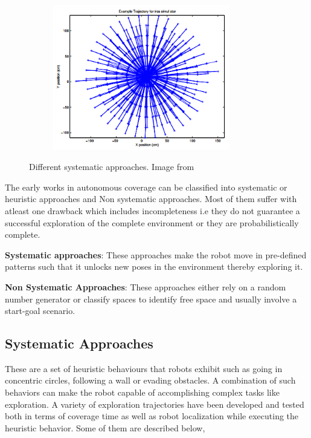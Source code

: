 \begin{figure}
\begin{subfigure}[b]{0.498\textwidth}
		\label{subfig:d}
		\caption{}
	\end{subfigure}
	\begin{subfigure}[b]{0.498\textwidth}
	    \centering
		\includegraphics[width=0.85\textwidth, height=0.85\textwidth]{images/star.png}
		\label{subfig:e}
		\caption{}
	\end{subfigure}
    \caption{Different systematic approaches. Image from \cite{13}}
\end{figure}

The early works in autonomous coverage can be classified into systematic or heuristic approaches and Non systematic approaches. Most of them suffer with atleast one drawback which includes incompleteness i.e they do not guarantee a successful exploration of the complete environment or they are probabilistically complete.

\textbf{Systematic approaches}: These approaches make the robot move in pre-defined patterns such that it unlocks new poses in the environment thereby exploring it.

\textbf{Non Systematic Approaches}: These approaches either rely on a random number generator or classify spaces to identify free space and usually involve a start-goal scenario.

\subsection{Systematic Approaches}
These are a set of heuristic behaviours that robots exhibit such as going in concentric circles, following a wall or evading obstacles\cite{8}. A combination of such behaviors can make the robot capable of accomplishing complex tasks like exploration. A variety of exploration trajectories have been developed and tested both in terms of coverage time as well as robot localization while executing the heuristic behavior. Some of them are described below\cite{26},

